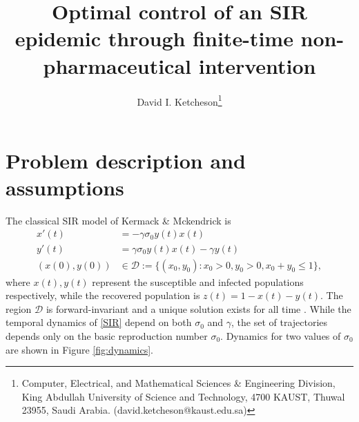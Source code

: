 \documentclass[english,12pt,letter]{article}
\newcommand{\Rnot}{\sigma_0}
\newcommand{\dom}{{\mathcal D}}
\begin{document}
\title{Optimal control of an SIR epidemic through finite-time non-pharmaceutical intervention}
\author{
  David I. Ketcheson\thanks{Computer, Electrical, and Mathematical Sciences \& Engineering Division,
King Abdullah University of Science and Technology, 4700 KAUST, Thuwal
23955, Saudi Arabia. (david.ketcheson@kaust.edu.sa)}
}
\maketitle


\section{Problem description and assumptions}
The classical SIR model of Kermack \& Mckendrick \cite{kermack1927contribution} is
\begin{subequations} \label{SIR}
\begin{align} 
    x'(t) & = -\gamma \Rnot y(t) x(t) \label{eq:x} \\
    y'(t) & = \gamma \Rnot y(t) x(t) - \gamma y(t) \label{eq:y} \\
    (x(0),y(0)) & \in \dom := \{(x_0,y_0) : x_0 > 0, y_0 > 0, x_0+y_0 \le 1\},
\end{align}
\end{subequations}
where $x(t), y(t)$ represent the susceptible and infected populations
respectively, while the recovered population is $z(t)=1-x(t)-y(t)$.  The region
$\dom$ is forward-invariant and a unique solution exists for all time
\cite{hethcote2000mathematics}.  While
the temporal dynamics of \eqref{SIR} depend on both $\Rnot$ and $\gamma$, the set
of trajectories depends only on the basic reproduction number 
$\Rnot$.  Dynamics for two values of $\Rnot$ are
shown in Figure \ref{fig:dynamics}.  
\end{document}
